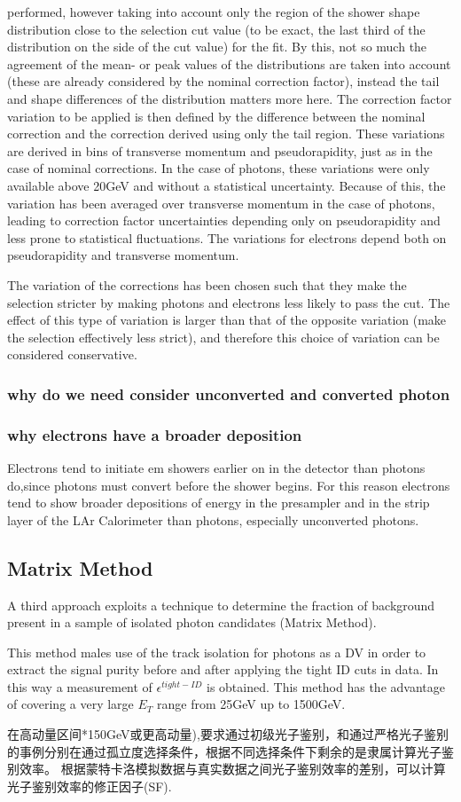 \documentclass{ctexart}
\begin{document}
 performed, however taking into account only the region of the shower shape distribution close to the selection cut value (to be exact, the last third of the distribution on the side of the cut value) for the fit. By this, not so much the agreement of the mean- or peak values of the distributions are taken into account (these are already considered by the nominal correction factor), instead the tail and shape differences of the distribution matters more here. The correction factor variation to be applied is then defined by the difference between the nominal correction and the correction derived using only the tail region. These variations are derived in bins of transverse momentum and pseudorapidity, just as in the case of nominal corrections. In the case of photons, these variations were only available above 20GeV and without a statistical uncertainty. Because of this, the variation has been averaged over transverse momentum in the case of photons, leading to correction factor uncertainties depending only on pseudorapidity and less
 prone to statistical fluctuations.  The variations for
 electrons depend both on pseudorapidity and transverse momentum. \par
 The variation of the corrections has been chosen such that they make the selection stricter by making
 photons and electrons less likely to pass the cut. The effect of this type of variation is larger than that of the opposite variation (make the selection effectively less strict), and therefore this choice of variation can
 be considered conservative.
\subsubsection{why do we need consider unconverted and converted photon}
\subsubsection{why electrons have a broader deposition}
Electrons tend to initiate em showers earlier on in the detector than photons do,since photons must convert before the shower begins. For this reason electrons tend to show  broader depositions of energy in the presampler and in the strip layer of the LAr Calorimeter than photons, especially unconverted photons.

\subsection{Matrix Method}
A third approach exploits a technique to
determine the fraction of background present in a sample of
isolated photon candidates (Matrix Method).\par
This method males use of the track isolation for photons as a DV in order to extract the signal purity before and after applying the tight ID cuts in data. In this way a measurement of $\epsilon ^{tight-ID}$ is obtained. This method has the advantage of covering a very large $E_T$ range from 25GeV up to 1500GeV.\par
在高动量区间*150GeV或更高动量),要求通过初级光子鉴别，和通过严格光子鉴别的事例分别在通过孤立度选择条件，根据不同选择条件下剩余的是隶属计算光子鉴别效率。
根据蒙特卡洛模拟数据与真实数据之间光子鉴别效率的差别，可以计算光子鉴别效率的修正因子(SF).
\end{document}
